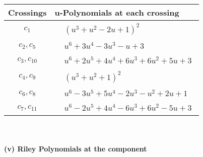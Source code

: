 \documentclass[1p]{elsarticle_modified}
\theoremstyle{definition}
\begin{document}
\begin{tabular}{m{50pt}|m{274pt}}
Crossings & \hspace{64pt}u-Polynomials at each crossing \\
\hline $$\begin{aligned}c_{1}\end{aligned}$$&$\begin{aligned}
&(u^3+u^2-2 u+1)^2
\end{aligned}$\\
\hline $$\begin{aligned}c_{2},c_{5}\end{aligned}$$&$\begin{aligned}
&u^6+3 u^4-3 u^3- u+3
\end{aligned}$\\
\hline $$\begin{aligned}c_{3},c_{10}\end{aligned}$$&$\begin{aligned}
&u^6+2 u^5+4 u^4+6 u^3+6 u^2+5 u+3
\end{aligned}$\\
\hline $$\begin{aligned}c_{4},c_{9}\end{aligned}$$&$\begin{aligned}
&(u^3+u^2+1)^2
\end{aligned}$\\
\hline $$\begin{aligned}c_{6},c_{8}\end{aligned}$$&$\begin{aligned}
&u^6-3 u^5+5 u^4-2 u^3- u^2+2 u+1
\end{aligned}$\\
\hline $$\begin{aligned}c_{7},c_{11}\end{aligned}$$&$\begin{aligned}
&u^6-2 u^5+4 u^4-6 u^3+6 u^2-5 u+3
\end{aligned}$\\
\hline
\end{tabular}\\~\\
\newpage\renewcommand{\arraystretch}{1}
\flushleft \textbf{(v) Riley Polynomials at the component}\newline \\
\end{document}
